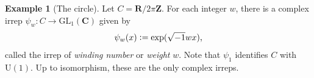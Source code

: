 \documentclass[a4paper,10pt,leqno]{article}
\numberwithin{equation}{section}
\theoremstyle{plain}
\theoremstyle{definition}
\newtheorem{ex}[thm]{Example}
\theoremstyle{remark}
\newcommand{\bb}{\mathbf}
\newcommand{\sapphire}[1]{\textcolor{sapphire}{#1}}
\newcommand{\dfemph}[1]{\sapphire{\emph{#1}}}
\newcommand{\GL}{\mathrm{GL}}
\newcommand{\SO}{\mathrm{SO}}
\newcommand{\UL}{\mathrm{U}}
\newcommand{\mat}[1]{\begin{matrix}#1\end{matrix}}
\newcommand{\pmat}[1]{\left(\mat{#1}\right)}
\begin{document}
\begin{ex}[The circle]\label{ex:r-mod-z}
Let $C = \bb{R}/2\pi \bb{Z}$.
For each integer $w$, there is a complex irrep $\psi_w \colon C \to \GL_1(\bb{C})$ given by 
\begin{align} 
\psi_w(x) \vcentcolon= \exp (\sqrt{-1}wx),
\end{align} 
called the irrep of \dfemph{winding number} or \dfemph{weight} $w$.
Note that $\psi_1$ identifies $C$ with $\UL(1)$.
Up to isomorphism, these are the only complex irreps.

\end{ex} 
\end{document}
